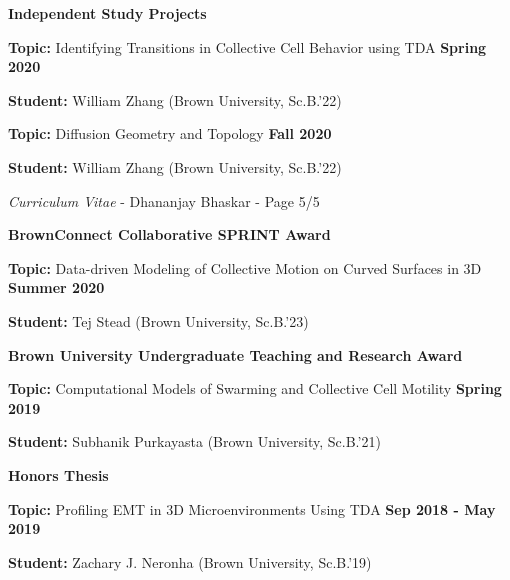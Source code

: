 \documentclass[margin,line]{res}
\newenvironment{list1}{
  \begin{list}{\ding{113}}{
      \setlength{\itemsep}{0in}
      \setlength{\parsep}{0in} \setlength{\parskip}{0in}
      \setlength{\topsep}{0in} \setlength{\partopsep}{0in}
      \setlength{\leftmargin}{0.17in}}}{\end{list}}
\begin{document}
\begin{resume}
{\bf Independent Study Projects}
\vspace*{.3cm}
\begin{list1}
\setlength\itemsep{0.2em}
\item[] {\bf Topic:} Identifying Transitions in Collective Cell Behavior using TDA \hfill {\bf Spring 2020}
\item[] {\bf Student:} William Zhang (Brown University, Sc.B.'22) 
\end{list1}
\vspace*{.3cm}
\begin{list1}
\setlength\itemsep{0.2em}
\item[] {\bf Topic:} Diffusion Geometry and Topology \hfill {\bf Fall 2020}
\item[] {\bf Student:} William Zhang (Brown University, Sc.B.'22)
\end{list1}


\newpage
\begin{flushright}
\textit{Curriculum Vitae} - Dhananjay Bhaskar - Page 5/5
\end{flushright}
\vspace*{.02cm}

{\bf BrownConnect Collaborative SPRINT Award}
\vspace*{.25cm}
\begin{list1}
\setlength\itemsep{0.2em}
\item[] {\bf Topic:} Data-driven Modeling of Collective Motion on Curved Surfaces in 3D \hfill {\bf Summer 2020}
\item[] {\bf Student:} Tej Stead (Brown University, Sc.B.'23)
\end{list1}

{\bf Brown University Undergraduate Teaching and Research Award}
\vspace*{.25cm}
\begin{list1}
\setlength\itemsep{0.2em}
\item[] {\bf Topic:} Computational Models of Swarming and Collective Cell Motility \hfill {\bf Spring 2019}
\item[] {\bf Student:} Subhanik Purkayasta (Brown University, Sc.B.'21)
\end{list1}

{\bf Honors Thesis}
\vspace*{.25cm}
\begin{list1}
\setlength\itemsep{0.2em}
\item[] {\bf Topic:} Profiling EMT in 3D Microenvironments Using TDA \hfill {\bf Sep 2018 - May 2019}
\item[] {\bf Student:} Zachary J. Neronha (Brown University, Sc.B.'19) 
\end{list1}


\end{resume}
\end{document}
